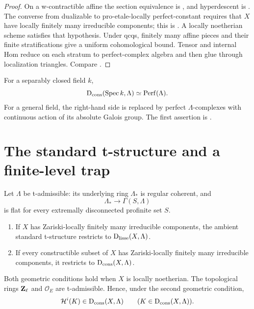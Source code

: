 \begin{proof}
On a w-contractible affine the section equivalence is
\cite[Lemma~4.1]{HRSConstructible}, and hyperdescent is
\cite[Corollary~4.7]{HRSConstructible}.  The converse from dualizable to
pro-etale-locally perfect-constant requires that \(X\) have locally finitely
many irreducible components; this is
\cite[Theorem~4.13]{HRSConstructible}.  A locally noetherian scheme satisfies
that hypothesis.  Under qcqs, finitely many affine pieces and their finite
stratifications give a uniform cohomological bound.  Tensor and internal Hom
reduce on each stratum to perfect-complex algebra and then glue through
localization triangles.  Compare
\cite[Lemmas~6.5.3 and 6.5.5]{BhattScholzeProEtale}.
\end{proof}

\begin{example}
\label{ex:constructible-point}
For a separably closed field \(k\),
\[
  \mathrm D_{\mathrm{cons}}(\operatorname{Spec} k,\Lambda)\simeq\operatorname{Perf}(\Lambda).
\]
For a general field, the right-hand side is replaced by perfect
\(\Lambda\)-complexes with continuous action of its absolute Galois group.
The first assertion is \cite[Example~6.5.2]{BhattScholzeProEtale}.
\end{example}

\section{The standard t-structure and a finite-level trap}

\begin{theorem}
\label{thm:proetale-adic-tstructure}
Let \(\Lambda\) be t-admissible: its underlying ring \(\Lambda_*\) is regular
coherent, and
\[
 \Lambda_*\longrightarrow\Gamma(S,\Lambda)
\]
is flat for every extremally disconnected profinite set \(S\).
\begin{enumerate}
\item If \(X\) has Zariski-locally finitely many irreducible components, the
      ambient standard t-structure restricts to
      \(\mathrm D_{\mathrm{lisse}}(X,\Lambda)\).
\item If every constructible subset of \(X\) has Zariski-locally finitely
      many irreducible components, it restricts to
      \(\mathrm D_{\mathrm{cons}}(X,\Lambda)\).
\end{enumerate}
Both geometric conditions hold when \(X\) is locally noetherian.
The topological rings \(\mathbf Z_\ell\) and \(\mathcal O_E\) are t-admissible.  Hence,
under the second geometric condition,
\[
  \mathcal H^i(K)\in\mathrm D_{\mathrm{cons}}(X,\Lambda)
  \qquad(K\in\mathrm D_{\mathrm{cons}}(X,\Lambda)).
\]
\end{theorem}

